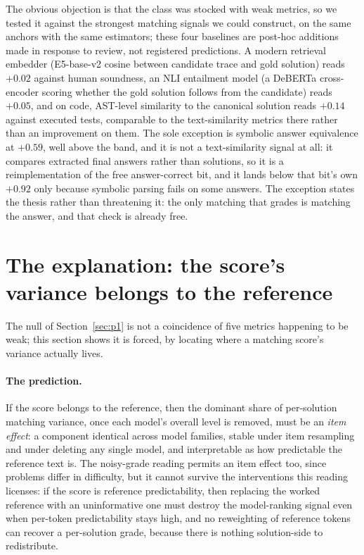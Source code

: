 \documentclass[11pt]{article}
\begin{document}
The obvious objection is that the class was stocked with weak metrics, so we tested it against the strongest matching signals we could construct, on the same anchors with the same estimators; these four baselines are post-hoc additions made in response to review, not registered predictions.
A modern retrieval embedder (E5-base-v2 cosine between candidate trace and gold solution) reads $+0.02$ against human soundness, an NLI entailment model (a DeBERTa cross-encoder scoring whether the gold solution follows from the candidate) reads $+0.05$, and on code, AST-level similarity to the canonical solution reads $+0.14$ against executed tests, comparable to the text-similarity metrics there rather than an improvement on them.
The sole exception is symbolic answer equivalence at $+0.59$, well above the band, and it is not a text-similarity signal at all: it compares extracted final answers rather than solutions, so it is a reimplementation of the free answer-correct bit, and it lands below that bit's own $+0.92$ only because symbolic parsing fails on some answers.
The exception states the thesis rather than threatening it: the only matching that grades is matching the answer, and that check is already free.

\section{The explanation: the score's variance belongs to the reference}
\label{sec:p2}

The null of Section~\ref{sec:p1} is not a coincidence of five metrics happening to be weak; this section shows it is forced, by locating where a matching score's variance actually lives.

\paragraph{The prediction.}
If the score belongs to the reference, then the dominant share of per-solution matching variance, once each model's overall level is removed, must be an \emph{item effect}: a component identical across model families, stable under item resampling and under deleting any single model, and interpretable as how predictable the reference text is.
The noisy-grade reading permits an item effect too, since problems differ in difficulty, but it cannot survive the interventions this reading licenses: if the score is reference predictability, then replacing the worked reference with an uninformative one must destroy the model-ranking signal even when per-token predictability stays high, and no reweighting of reference tokens can recover a per-solution grade, because there is nothing solution-side to redistribute.
\end{document}
